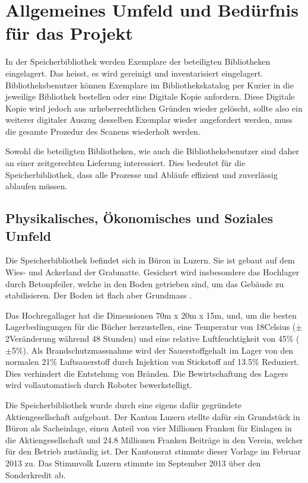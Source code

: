\chapter{Allgemeines Umfeld und Bedürfnis für das Projekt}
In der Speicherbibliothek werden Exemplare der beteiligten Bibliotheken eingelagert. Das heisst, es wird gereinigt und inventarisiert eingelagert. Bibliotheksbenutzer können Exemplare im Bibliothekskatalog per Kurier in die jeweilige Bibliothek bestellen oder eine Digitale Kopie anfordern. Diese Digitale Kopie wird jedoch aus urheberrechtlichen Gründen wieder gelöscht, sollte also ein weiterer digitaler Auszug desselben Exemplar wieder angefordert werden, muss die gesamte Prozedur des Scanens wiederholt werden.

Sowohl die beteiligten Bibliotheken, wie auch die Bibliotheksbenutzer sind daher an einer zeitgerechten Lieferung interessiert. Dies bedeutet für die Speicherbibliothek, dass alle Prozesse und Abläufe effizient und zuverlässig ablaufen müssen.

\section{Physikalisches, Ökonomisches und Soziales Umfeld}
Die Speicherbibliothek befindet sich in Büron in Luzern. Sie ist gebaut auf dem Wies- und Ackerland der Grabmatte. Gesichert wird insbesondere das Hochlager durch Betonpfeiler, welche in den Boden getrieben sind, um das Gebäude zu stabilisieren. Der Boden ist flach aber Grundmass \parencite{MapGeoAdmin2019}.

Das Hochregallager hat die Dimensionen 70m x 20m x 15m, und, um die besten Lagerbedingungen für die Bücher herzustellen, eine Temperatur von 18\SIUnitSymbolDegree Celsius ($\pm$ 2\SIUnitSymbolDegree Veränderung während 48 Stunden) und eine relative Luftfeuchtigkeit von 45\% ($\pm$5\%). Als Brandschutzmassnahme wird der Sauerstoffgehalt im Lager von den normalen 21\% Luftsauerstoff durch Injektion von Stickstoff auf 13.5\% Reduziert. Dies verhindert die Entstehung von Bränden.
Die Bewirtschaftung des Lagers wird vollautomatisch durch Roboter bewerkstelligt.

Die Speicherbibliothek wurde durch eine eigens dafür gegründete Aktiengesellschaft aufgebaut. Der Kanton Luzern stellte dafür ein Grundstück in Büron als Sacheinlage, einen Anteil von vier Millionen Franken für Einlagen in die Aktiengesellschaft und 24.8 Millionen Franken Beiträge in den Verein, welcher für den Betrieb zuständig ist. Der Kantonsrat stimmte dieser Vorlage im Februar 2013 zu. Das Stimmvolk Luzern stimmte im September 2013 über den Sonderkredit ab. 

